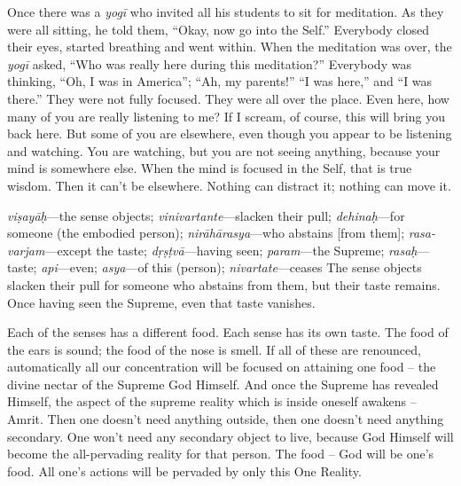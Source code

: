 Once there was a \textit{yogī} who invited all his students to sit for meditation. As they were all sitting, he told them, “Okay, now go into the Self.” Everybody closed their eyes, started breathing and went within. When the meditation was over, the \textit{yogī} asked, “Who was really here during this meditation?” Everybody was thinking, “Oh, I was in America”; “Ah, my parents!” “I was here,” and “I was there.” They were not fully focused. They were all over the place. Even here, how many of you are really listening to me? If I scream, of course, this will bring you back here. But some of you are elsewhere, even though you appear to be listening and watching. You are watching, but you are not seeing anything, because your mind is somewhere else. When the mind is focused in the Self, that is true wisdom. Then it can’t be elsewhere. Nothing can distract it; nothing can move it.

{%
  \textit{viṣayāḥ}---the sense objects; 
  \textit{vinivartante}---slacken their pull; 
  \textit{dehinaḥ}---for someone (the embodied person); 
  \textit{nirāhārasya}---who abstains [from them]; 
  \textit{rasa-varjam}---except the taste; 
  \textit{dṛṣṭvā}---having seen; 
  \textit{param}---the Supreme; 
  \textit{rasaḥ}---taste; 
  \textit{api}---even; 
  \textit{asya}---of this (person); 
  \textit{nivartate}---ceases
}
{%
  The sense objects slacken their pull for someone who abstains from them, but their taste remains. Once having seen the Supreme, even that taste vanishes.
}

Each of the senses has a different food. Each sense has its own taste. The food of the ears is sound; the food of the nose is smell. If all of these are renounced, automatically all our concentration will be focused on attaining one food – the divine nectar of the Supreme God Himself. And once the Supreme has revealed Himself, the aspect of the supreme reality which is inside oneself awakens – Amrit. Then one doesn’t need anything outside, then one doesn’t need anything secondary. One won’t need any secondary object to live, because God Himself will become the all-pervading reality for that person. The food – God will be one’s food. All one’s actions will be pervaded by only this One Reality.

